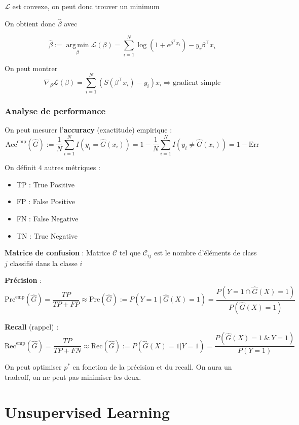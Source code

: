 \documentclass[12pt,a4paper]{article}
\begin{document}
$\mathcal{L}$ est convexe, on peut donc trouver un minimum

\medskip

On obtient donc $\hat{\beta}$ avec

$$\hat{\beta} := \operatorname*{arg\,min}_{\beta} \mathcal{L}(\beta) = \sum_{i=1}^{N} \log(1 + e^{\beta^{\top} x_i}) - y_i \beta^{\top} x_i$$

On peut montrer
$$\nabla_{\beta} \mathcal{L}(\beta) = \sum_{i=1}^{N} (S(\beta^{\top} x_i) - y_i) x_i \Rightarrow \text{gradient simple}$$

\subsubsection{Analyse de performance}

On peut mesurer l'\textbf{accuracy} (exactitude) empirique :
$$\text{Acc}^{\text{emp}}(\hat{G}) := \frac{1}{N} \sum_{i=1}^{N} I(y_i = \hat{G}(x_i)) = 1 - \frac{1}{N} \sum_{i=1}^{N} I(y_i \neq \hat{G}(x_i)) = 1 - \text{Err}$$

On définit $4$ autres métriques :
\begin{itemize}
    \item TP : True Positive
    \item FP : False Positive
    \item FN : False Negative
    \item TN : True Negative
\end{itemize}

\textbf{Matrice de confusion} : Matrice $\mathcal{C}$ tel que $\mathcal{C}_{ij}$ est le nombre d'éléments de class $j$ classifié dans la classe $i$

\medskip

\textbf{Précision} :
$$\text{Pre}^{\text{emp}}(\hat{G}) = \frac{TP}{TP + FP} \approx \text{Pre}(\hat{G}) := P(Y=1 \mid \hat{G}(X)=1) = \frac{P(Y=1 \cap \hat{G}(X)=1)}{P(\hat{G}(X)=1)}$$

\textbf{Recall} (rappel) :
$$\text{Rec}^{\text{emp}}(\hat{G}) = \frac{TP}{TP + FN} \approx \text{Rec}(\hat{G}) := P(\hat{G}(X) = 1 | Y = 1) = \frac{P(\hat{G}(X) = 1 \ \& \ Y = 1)}{P(Y = 1)}$$

On peut optimiser $p^*$ en fonction de la précision et du recall. On aura un tradeoff, on ne peut pas minimiser les deux.


\section{Unsupervised Learning}
\end{document}
